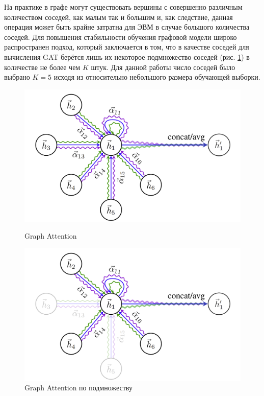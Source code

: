 \documentclass[diploma]{nanolab2015}
\begin{document}
На практике в графе могут существовать вершины с совершенно различным количеством соседей, как малым так и большим и, как следствие, данная операция может быть крайне затратна для ЭВМ в случае большого количества соседей. Для повышения стабильности обучения графовой модели широко распространен подход, который заключается в том, что в качестве соседей для вычисления GAT берётся лишь их некоторое подмножество соседей (рис. \ref{gat:2}) в количестве не более чем $K$ штук. Для данной работы число соседей было выбрано $K=5$ исходя из относительно небольшого размера обучающей выборки.

\begin{figure}[ht]
\centering
\begin{minipage}{.5\textwidth}
  \centering
  \includegraphics[width=1.0\linewidth]{./assets/GAT_layer_normal.png}
\caption{Graph Attention}
  \label{gat:1}
\end{minipage}%
\begin{minipage}{.5\textwidth}
  \centering
  \includegraphics[width=1.0\linewidth]{./assets/GAT_layer_opacity.png}
  \caption{Graph Attention по подмножеству}
  \label{gat:2}
\end{minipage}
\end{figure}
\end{document}
